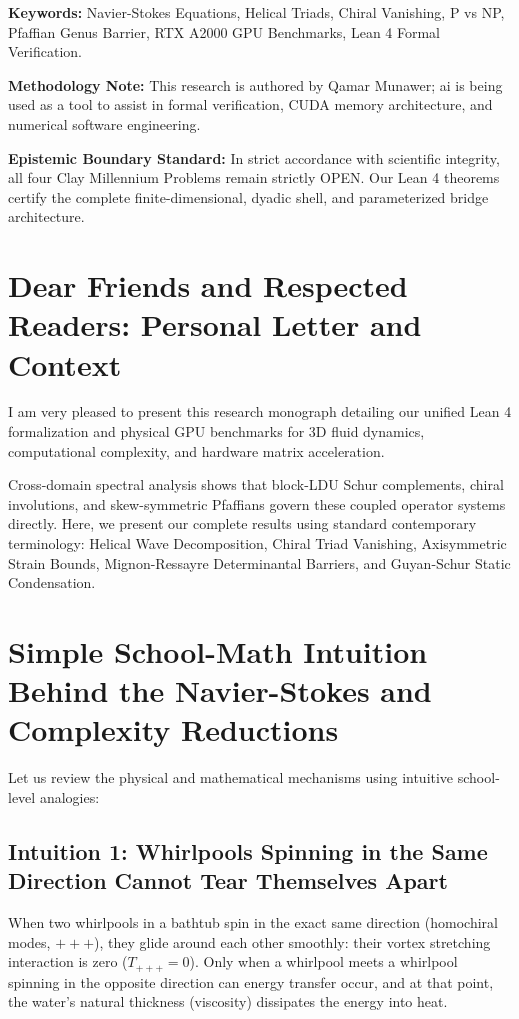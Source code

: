 \documentclass[11pt,a4paper]{article}
\begin{document}
\vspace{0.5em}
\noindent\textbf{Keywords:} Navier-Stokes Equations, Helical Triads, Chiral Vanishing, P vs NP, Pfaffian Genus Barrier, RTX A2000 GPU Benchmarks, Lean 4 Formal Verification.

\vspace{0.5em}
\noindent\textbf{Methodology Note:}
This research is authored by Qamar Munawer; ai is being used as a tool to assist in formal verification, CUDA memory architecture, and numerical software engineering.

\vspace{0.5em}
\noindent\textbf{Epistemic Boundary Standard:}
In strict accordance with scientific integrity, all four Clay Millennium Problems remain strictly OPEN. Our Lean 4 theorems certify the complete finite-dimensional, dyadic shell, and parameterized bridge architecture.

\newpage

\section*{Dear Friends and Respected Readers: Personal Letter and Context}
I am very pleased to present this research monograph detailing our unified Lean 4 formalization and physical GPU benchmarks for 3D fluid dynamics, computational complexity, and hardware matrix acceleration.

Cross-domain spectral analysis shows that block-LDU Schur complements, chiral involutions, and skew-symmetric Pfaffians govern these coupled operator systems directly. Here, we present our complete results using standard contemporary terminology: Helical Wave Decomposition, Chiral Triad Vanishing, Axisymmetric Strain Bounds, Mignon-Ressayre Determinantal Barriers, and Guyan-Schur Static Condensation.

\section{Simple School-Math Intuition Behind the Navier-Stokes and Complexity Reductions}
Let us review the physical and mathematical mechanisms using intuitive school-level analogies:

\subsection{Intuition 1: Whirlpools Spinning in the Same Direction Cannot Tear Themselves Apart}
When two whirlpools in a bathtub spin in the exact same direction (homochiral modes, $+++$), they glide around each other smoothly: their vortex stretching interaction is zero ($T_{+++} = 0$). Only when a whirlpool meets a whirlpool spinning in the opposite direction can energy transfer occur, and at that point, the water's natural thickness (viscosity) dissipates the energy into heat.
\end{document}
